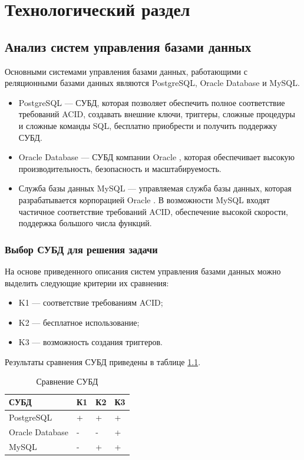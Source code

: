 \chapter{Технологический раздел}

\section{Анализ систем управления базами данных}

Основными системами управления базами данных, работающими с реляционными базами данных являются PostgreSQL, Oracle Database и MySQL.

\begin{itemize}
	\item PostgreSQL --- СУБД, которая позволяет обеспечить полное соответствие требований ACID, создавать внешние ключи, триггеры, сложные процедуры и сложные команды SQL, бесплатно приобрести и получить поддержку СУБД.
	\item Oracle Database --- СУБД компании Oracle \cite{oracle}, которая обеспечивает высокую производительность, безопасность и масштабируемость.
	\item Служба базы данных MySQL --- управляемая служба базы данных, которая разрабатывается корпорацией Oracle \cite{mysql}. В возможности MySQL входят частичное соответствие требований ACID, обеспечение высокой скорости, поддержка большого числа функций.
\end{itemize}

\subsection{Выбор СУБД для решения задачи}

На основе приведенного описания систем управления базами данных можно выделить следующие критерии их сравнения:
\begin{itemize}
	\item K1 --- соответствие требованиям ACID;
	\item K2 --- бесплатное использование;
	\item K3 --- возможность создания триггеров.
\end{itemize}

Результаты сравнения СУБД приведены в таблице \ref{tab:dsm}.

\begin{table}[h]
    \caption{Сравнение СУБД}
    \begin{center}
        \begin{tabular}{|l|l|l|l|}
            \hline
            \textbf{СУБД} & \textbf{К1} & \textbf{К2} & \textbf{К3} \\ \hline
            PostgreSQL & + & + & + \\ \hline
            Oracle Database & - & - & + \\ \hline
            MySQL & - & + & + \\ \hline
        \end{tabular}
    \end{center}
    \label{tab:dsm}
\end{table}

